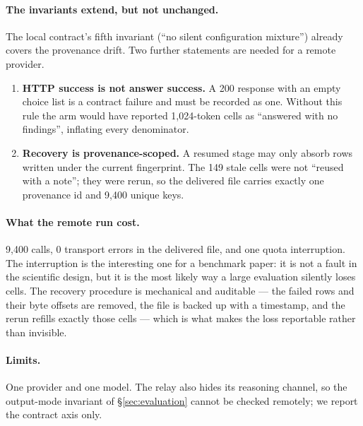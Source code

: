 \paragraph{The invariants extend, but not unchanged.} The local contract's fifth
invariant (``no silent configuration mixture'') already covers the provenance
drift. Two further statements are needed for a remote provider.

\begin{enumerate}[leftmargin=1.4em,itemsep=1pt,topsep=2pt]
\item \textbf{HTTP success is not answer success.} A 200 response with an empty
choice list is a contract failure and must be recorded as one. Without this rule
the arm would have reported 1,024-token cells as ``answered with no findings'',
inflating every denominator.
\item \textbf{Recovery is provenance-scoped.} A resumed stage may only absorb rows
written under the current fingerprint. The 149 stale cells were not ``reused with
a note''; they were rerun, so the delivered file carries exactly one provenance
id and 9,400 unique keys.
\end{enumerate}

\paragraph{What the remote run cost.} 9,400 calls, 0 transport errors in the
delivered file, and one quota interruption. The interruption is the interesting
one for a benchmark paper: it is not a fault in the scientific design, but it is
the most likely way a large evaluation silently loses cells. The recovery
procedure is mechanical and auditable --- the failed rows and their byte offsets
are removed, the file is backed up with a timestamp, and the rerun refills exactly
those cells --- which is what makes the loss reportable rather than invisible.

\paragraph{Limits.} One provider and one model. The relay also hides its reasoning
channel, so the output-mode invariant of \S\ref{sec:evaluation} cannot be checked
remotely; we report the contract axis only.
